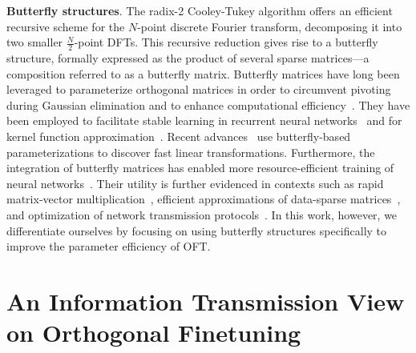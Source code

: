 \textbf{Butterfly structures}. The radix-2 Cooley-Tukey algorithm offers an efficient recursive scheme for the $N$-point discrete Fourier transform, decomposing it into two smaller $\frac{N}{2}$-point DFTs. This recursive reduction gives rise to a butterfly structure, formally expressed as the product of several sparse matrices—a composition referred to as a butterfly matrix. Butterfly matrices have long been leveraged to parameterize orthogonal matrices in order to circumvent pivoting during Gaussian elimination and to enhance computational efficiency~\cite{parker1995random}. They have been employed to facilitate stable learning in recurrent neural networks~\cite{jing2017tunable} and for kernel function approximation~\cite{munkhoeva2018quadrature}. Recent advances~\cite{dao2019learning,dao2019kaleidoscope} use butterfly-based parameterizations to discover fast linear transformations. Furthermore, the integration of butterfly matrices has enabled more resource-efficient training of neural networks~\cite{chen2022pixelated,dao2022monarch}. Their utility is further evidenced in contexts such as rapid matrix-vector multiplication~\cite{michielssen1996multilevel,o2010algorithm}, efficient approximations of data-sparse matrices~\cite{li2015butterfly}, and optimization of network transmission protocols~\cite{klasing1994broadcasting,li2003linear,rajasingh2016transmission}. In this work, however, we differentiate ourselves by focusing on using butterfly structures specifically to improve the parameter efficiency of OFT.

\section{An Information Transmission View on Orthogonal Finetuning}

